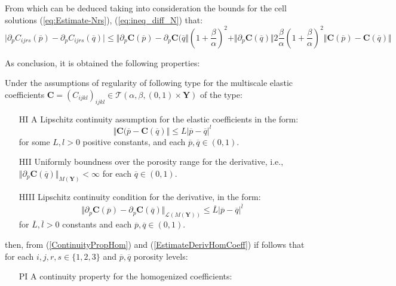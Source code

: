 From which can be deduced taking into consideration the bounds for the cell solutions (\ref{eq:Estimate-Nrs}), (\ref{eq:ineq_diff_N}) that:
\begin{equation}
    \label{EstimateDiffDeriv}
    \vert \partial_p C_{ijrs}(\overline{p}) - \partial_p C_{ijrs}(\overline{q}) \vert \leq \Vert \partial_p \mathbf{C}(\overline{p}) - \partial_p \mathbf{C}(\overline{q} \Vert  (1+ \frac{\beta}{\alpha})^2 + \Vert \partial_p \mathbf{C}(\overline{q}) \Vert 2\frac{\beta}{\alpha}(1+\frac{\beta}{\alpha})^2 \Vert \mathbf{C}(\overline{p}) - \mathbf{C}(\overline{q}) \Vert
\end{equation}

As conclusion, it is obtained the following properties:
\begin{prop}
Under the assumptions of regularity of following type for the multiscale elastic coefficients $\mathbf{C} = (C_{ijkl})_{ijkl} \in \mathcal{T}(\alpha, \beta, (0,1)\times \mathbf{Y})$ of the type:
\begin{enumerate}
    \item[HI] A Lipschitz continuity assumption for the elastic coefficients in the form:
    \begin{equation*}
        \Vert \mathbf{C}(\overline{p} - \mathbf{C}(\overline{q}) \Vert \leq L \vert \overline{p} - \overline{q} \vert^{l} 
    \end{equation*}
    for some $L, l > 0$ positive constants, and each $\overline{p},\overline{q} \in (0,1)$.
    \item[HII] Uniformly boundness over the porosity range for the derivative, i.e., $\Vert \partial_p \mathbf{C}(\overline{q}) \Vert_{M(\mathbf{Y})} < \infty$ for each $\overline{q} \in (0,1)$.
    \item[HIII] Lipschitz continuity condition for the derivative, in the form:
    \begin{equation*}
        \Vert \partial_p \mathbf{C}(\overline{p})- \partial_p \mathbf{C}(\overline{q}) \Vert_{\mathcal{L}(M(\mathbf{Y}))} \leq \overline{L} \vert \overline{p}-\overline{q}\vert^{\overline{l}}
    \end{equation*}
    for $\overline{L}, \overline{l} > 0$ constants and each $\overline{p},\overline{q} \in (0,1)$.
\end{enumerate}
then, from (\ref{ContinuityPropHom}) and (\ref{EstimateDerivHomCoeff}) if follows that for each $i,j,r,s \in \{1,2,3\}$ and $\overline{p},\overline{q}$ porosity levels:
\begin{enumerate}
    \item[PI] A continuity property for the homogenized coefficients:

\end{enumerate}
\end{prop}
